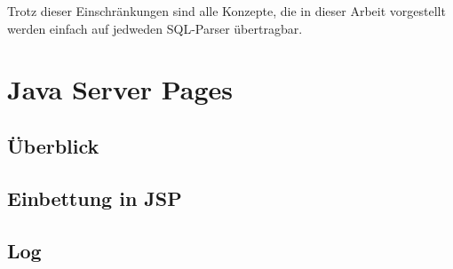 Trotz dieser Einschränkungen sind alle Konzepte, die in dieser Arbeit vorgestellt werden einfach auf jedweden SQL-Parser übertragbar.


\section{Java Server Pages}

\subsection{Überblick}

\subsection{Einbettung in JSP}

\subsection{Log}